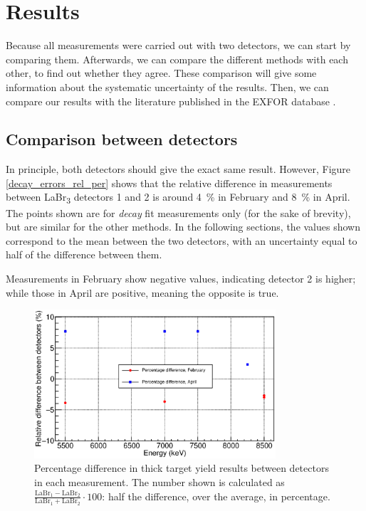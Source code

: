 \documentclass[a4paper,12pt]{report}
\begin{document}
\section{Results}
Because all measurements were carried out with two detectors, we can start by comparing them.
Afterwards, we can compare the different methods with each other, to find out whether they agree.
These comparison will give some information about the systematic uncertainty of the results.
Then, we can compare our results with the literature published in the EXFOR database \cite{jacobs}.

\subsection{Comparison between detectors}
In principle, both detectors should give the exact same result.
However, Figure \ref{decay_errors_rel_per} shows that the relative difference in measurements between LaBr\textsubscript{3} detectors 1 and 2 is around \qty{4}{\percent} in February and \qty{8}{\percent} in April.
The points shown are for \textit{decay} fit measurements only (for the sake of brevity), but are similar for the other methods.
In the following sections, the values shown correspond to the mean between the two detectors, with an uncertainty equal to half of the difference between them.

Measurements in February show negative values, indicating detector 2 is higher; while those in April are positive, meaning the opposite is true.
\\

\begin{figure}[H]
	\centering
	\includegraphics[width=0.80\textwidth]{decay_errors_rel_per_fixed.eps}
	\caption{Percentage difference in thick target yield results between detectors in each measurement.
	The number shown is calculated as $\frac{\text{LaBr}_1-\text{LaBr}_2}{\text{LaBr}_1+\text{LaBr}_2}\cdot 100$: half the difference, over the average, in percentage.}
	\label{decay_errors_rel_per_fixed}
\end{figure}
\end{document}
